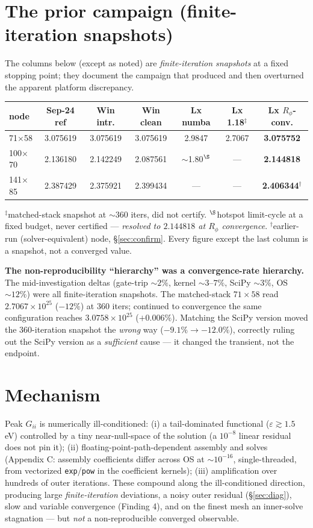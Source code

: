 \documentclass[11pt]{article}
\newcommand{\ten}[1]{\times 10^{#1}}
\begin{document}
\section{The prior campaign (finite-iteration snapshots)}
The columns below (except as noted) are \emph{finite-iteration snapshots} at a fixed stopping point; they document the campaign that produced and then overturned the apparent platform discrepancy.
\begin{center}\small
\begin{tabular}{l c c c c c c}
\toprule
node & Sep-24 ref & Win intr. & Win clean & Lx numba & Lx 1.18$^{\ddagger}$ & \textbf{Lx $R_\phi$-conv.} \\
\midrule
71$\times$58  & 3.075619 & 3.075619 & 3.075619 & 2.9847 & 2.7067 & \textbf{3.075752} \\
100$\times$70 & 2.136180 & 2.142249 & 2.087561 & $\sim$1.80$^{\S}$ & --- & \textbf{2.144818} \\
141$\times$85 & 2.387429 & 2.375921 & 2.399434 & --- & --- & \textbf{2.406344}$^{\dagger}$ \\
\bottomrule
\end{tabular}
\end{center}
{\footnotesize $^{\ddagger}$matched-stack snapshot at $\sim\!360$ iters, did not certify. $^{\S}$hotspot limit-cycle at a fixed budget, never certified --- \emph{resolved to $2.144818$ at $R_\phi$ convergence}. $^{\dagger}$earlier-run (solver-equivalent) node, \S\ref{sec:confirm}. Every figure except the last column is a snapshot, not a converged value.}

\textbf{The non-reproducibility ``hierarchy'' was a convergence-rate hierarchy.} The mid-investigation deltas (gate-trip $\sim\!2\%$, kernel $\sim\!3$--$7\%$, SciPy $\sim\!3\%$, OS $\sim\!12\%$) were all finite-iteration snapshots. The matched-stack $71\times58$ read $2.7067\ten{25}$ ($-12\%$) at $360$ iters; continued to convergence the same configuration reaches $3.0758\ten{25}$ ($+0.006\%$). Matching the SciPy version moved the $360$-iteration snapshot the \emph{wrong} way ($-9.1\%\to-12.0\%$), correctly ruling out the SciPy version as a \emph{sufficient} cause --- it changed the transient, not the endpoint.

\section{Mechanism}
Peak $G_{ii}$ is numerically ill-conditioned: (i) a tail-dominated functional ($\varepsilon\gtrsim1.5$\,eV) controlled by a tiny near-null-space of the solution (a $10^{-8}$ linear residual does not pin it); (ii) floating-point-path-dependent assembly and solves (Appendix C: assembly coefficients differ across OS at $\sim\!10^{-16}$, single-threaded, from vectorized \texttt{exp}/\texttt{pow} in the coefficient kernels); (iii) amplification over hundreds of outer iterations. These compound along the ill-conditioned direction, producing large \emph{finite-iteration} deviations, a noisy outer residual (\S\ref{sec:diag}), slow and variable convergence (Finding 4), and on the finest mesh an inner-solve stagnation --- but \emph{not} a non-reproducible converged observable.
\end{document}

